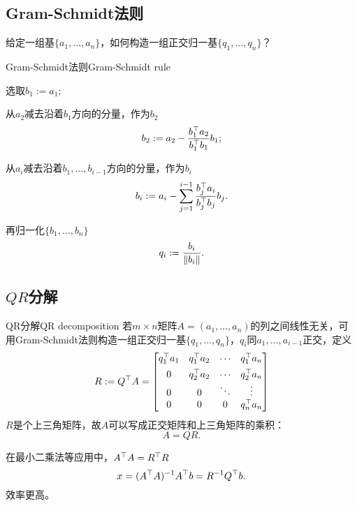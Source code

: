\subsection{Gram-Schmidt法则}

给定一组基$\{a_1,\ldots,a_n\}$，如何构造一组正交归一基$\{q_1,\ldots,q_n\}$？
\begin{method}{Gram-Schmidt法则}{Gram-Schmidt rule}
	\begin{compactenum}
		\item 选取$b_1:=a_1;$
		\item 从$a_2$减去沿着$b_1$方向的分量，作为$b_2$
		\[
			b_2:=a_2-\frac{b_1^\top a_2}{b_1^\top b_1}b_1;
		\]
		\item 从$a_i$减去沿着$b_1,\ldots,b_{i-1}$方向的分量，作为$b_i$
		\[
			b_i:=a_i-\sum_{j=1}^{i-1}\frac{b_j^\top a_i}{b_j^\top b_j}b_j.
		\]
	\end{compactenum}
	再归一化$\{b_1,\ldots,b_n\}$
	\[
		q_i:=\frac{b_i}{\left\lVert b_i\right\rVert}.
	\]
\end{method}

\subsection{\texorpdfstring{$QR$}{QR}分解}

\begin{theorem}{QR分解}{QR decomposition}
	若$m\times n$矩阵$A=(a_1,\ldots,a_n)$的列之间线性无关，可用Gram-Schmidt法则构造一组正交归一基$\{q_1,\ldots,q_n\}$，$q_i$同$a_1,\ldots,a_{i-1}$正交，定义
	\[
		R:=Q^\top A=\begin{bmatrix}
			q_1^\top a_1&q_1^\top a_2&\cdots&q_1^\top a_n\\[1ex]
			0&q_2^\top a_2&\cdots&q_2^\top a_n\\
			0&0&\ddots&\vdots\\
			0&0&0&q_n^\top a_n
		\end{bmatrix}
	\]
	$R$是个上三角矩阵，故$A$可以写成正交矩阵和上三角矩阵的乘积：
	\begin{equation}
		A=QR.
	\end{equation}
\end{theorem}

在最小二乘法等应用中，$A^\top A=R^\top R$
\[
	x=(A^\top A)^{-1} A^\top b=R^{-1} Q^\top b.
\]
效率更高。
